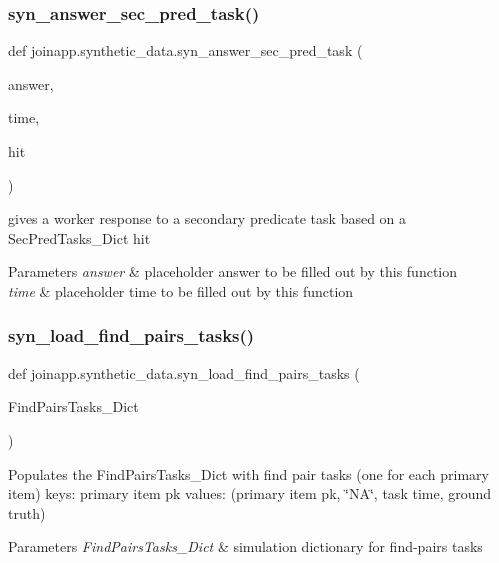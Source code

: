 \subsubsection{\texorpdfstring{syn\_answer\_sec\_pred\_task()}{syn\_answer\_sec\_pred\_task()}}
{\footnotesize\ttfamily def joinapp.\+synthetic\+\_\+data.\+syn\+\_\+answer\+\_\+sec\+\_\+pred\+\_\+task (\begin{DoxyParamCaption}\item[{}]{answer,  }\item[{}]{time,  }\item[{}]{hit }\end{DoxyParamCaption})}



gives a worker response to a secondary predicate task based on a Sec\+Pred\+Tasks\+\_\+\+Dict hit 


\begin{DoxyParams}{Parameters}
{\em answer} & placeholder answer to be filled out by this function \\
\hline
{\em time} & placeholder time to be filled out by this function \\
\hline
\end{DoxyParams}
\mbox{\label{namespacejoinapp_1_1synthetic__data_a14be15b18ecf80f61e02b26f86262041}} 
\subsubsection{\texorpdfstring{syn\_load\_find\_pairs\_tasks()}{syn\_load\_find\_pairs\_tasks()}}
{\footnotesize\ttfamily def joinapp.\+synthetic\+\_\+data.\+syn\+\_\+load\+\_\+find\+\_\+pairs\+\_\+tasks (\begin{DoxyParamCaption}\item[{}]{Find\+Pairs\+Tasks\+\_\+\+Dict }\end{DoxyParamCaption})}



Populates the Find\+Pairs\+Tasks\+\_\+\+Dict with find pair tasks (one for each primary item) keys\+: primary item pk values\+: (primary item pk, \char`\"{}\+N\+A\char`\"{}, task time, ground truth) 


\begin{DoxyParams}{Parameters}
{\em Find\+Pairs\+Tasks\+\_\+\+Dict} & simulation dictionary for find-\/pairs tasks \\
\hline
\end{DoxyParams}
\mbox{\label{namespacejoinapp_1_1synthetic__data_a18d0c22966d3c7e8bd7d8d79f95f8a02}} 

